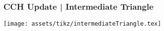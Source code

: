 \begin{frame}
    \frametitle{CCH Update | Intermediate Triangle}

    \texttt{[image: assets/tikz/intermediateTriangle.tex]}
\end{frame}